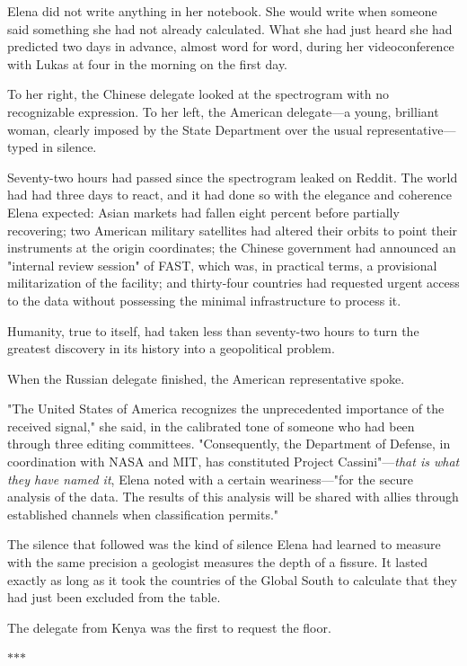 \documentclass[11pt,a5paper,twoside]{book}
\begin{document}
Elena did not write anything in her notebook. She would write when someone said something she had not already calculated. What she had just heard she had predicted two days in advance, almost word for word, during her videoconference with Lukas at four in the morning on the first day.

To her right, the Chinese delegate looked at the spectrogram with no recognizable expression. To her left, the American delegate—a young, brilliant woman, clearly imposed by the State Department over the usual representative—typed in silence.

Seventy-two hours had passed since the spectrogram leaked on Reddit. The world had had three days to react, and it had done so with the elegance and coherence Elena expected: Asian markets had fallen eight percent before partially recovering; two American military satellites had altered their orbits to point their instruments at the origin coordinates; the Chinese government had announced an "internal review session" of FAST, which was, in practical terms, a provisional militarization of the facility; and thirty-four countries had requested urgent access to the data without possessing the minimal infrastructure to process it.

Humanity, true to itself, had taken less than seventy-two hours to turn the greatest discovery in its history into a geopolitical problem.

When the Russian delegate finished, the American representative spoke.

"The United States of America recognizes the unprecedented importance of the received signal," she said, in the calibrated tone of someone who had been through three editing committees. "Consequently, the Department of Defense, in coordination with NASA and MIT, has constituted Project Cassini"—\textit{that is what they have named it}, Elena noted with a certain weariness—"for the secure analysis of the data. The results of this analysis will be shared with allies through established channels when classification permits."

The silence that followed was the kind of silence Elena had learned to measure with the same precision a geologist measures the depth of a fissure. It lasted exactly as long as it took the countries of the Global South to calculate that they had just been excluded from the table.

The delegate from Kenya was the first to request the floor.

\vspace{1.5em}
\begin{center}$\ast$\quad$\ast$\quad$\ast$\end{center}
\vspace{1.5em}
\end{document}
